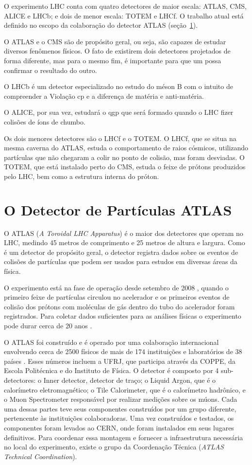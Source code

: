 O experimento LHC conta com quatro detectores de maior escala: ATLAS, CMS, ALICE e
LHCb; e dois de menor escala: TOTEM e LHCf. O trabalho atual está definido no
escopo da colaboração do detector ATLAS (seção~\ref{sec:ATLAS}).

O ATLAS e o CMS são de propósito geral, ou seja, são capazes de estudar diversos
fenômenos físicos. O fato de existirem dois detectores projetados de forma
diferente, mas para o mesmo fim, é importante para que um possa confirmar o
resultado do outro.

O LHCb é um detector especializado no estudo do méson B com o
intuito de compreender a Violação \gls{cp} e a diferença de matéria e anti-matéria.

O ALICE, por sua vez, estudará o \gls{qgp} que será formado quando o
LHC fizer colisões de íons de chumbo.

Os dois menores detectores são o LHCf e o TOTEM. O LHCf, que se situa na mesma
caverna do ATLAS, estuda o comportamento de raios cósmicos, utilizando
partículas que não chegaram a colir no ponto de colisão, mas foram desviadas.
O TOTEM, que está instalado perto do CMS, estuda o feixe de prótons produzidos
pelo LHC, bem como a estrutura interna do próton.

\section{O Detector de Partículas ATLAS}
\label{sec:ATLAS}

O ATLAS (\textit{A Toroidal LHC Apparatus}) é o maior dos detectores que operam
no LHC, medindo 45 metros de comprimento e 25 metros de altura e largura. Como é
um detector de propósito geral, o detector registra dados sobre os eventos de
colisões de partículas que podem ser usados para estudos em diversas áreas da
física. 

O experimento está na fase de operação desde setembro de 2008 \cite{webLHC},
quando o primeiro feixe de partículas circulou no acelerador e os primeiros
eventos de colisão dos prótons com moléculas de gás dentro do tubo do acelerador
foram registrados. Para coletar dados suficientes para as análises físicas o
experimento pode durar cerca de 20 anos \cite{ATLAS_TDR}.

O ATLAS foi construído e é operado por uma colaboração internacional envolvendo
cerca de 2500 físicos de mais de 174 instituições e laboratórios de 38 países
\cite{webATLAS}. Esses números incluem a UFRJ, que participa através da COPPE,
da Escola Politécnica e do Instituto de Física. O detector é composto por 4
sub-detectores: o Inner detector, detector de traço; o Liquid Argon, que é o
calorímetro eletromagnético; o Tile Calorimeter, que é o calorímetro hadrônico,
e o Muon Spectrometer responsável por realizar medições sobre os múons. Cada uma
dessas partes teve seus componentes construídos por um grupo diferente,
pertencente às instituições colaboradoras.  Uma vez construídos e testados, os
componentes foram levados ao CERN, onde foram instalados em seus lugares
definitivos. Para coordenar essa montagem e fornecer a infraestrutura
necessária no local do experimento, existe o grupo da Coordenação Técnica
({\it ATLAS Technical Coordination}).

